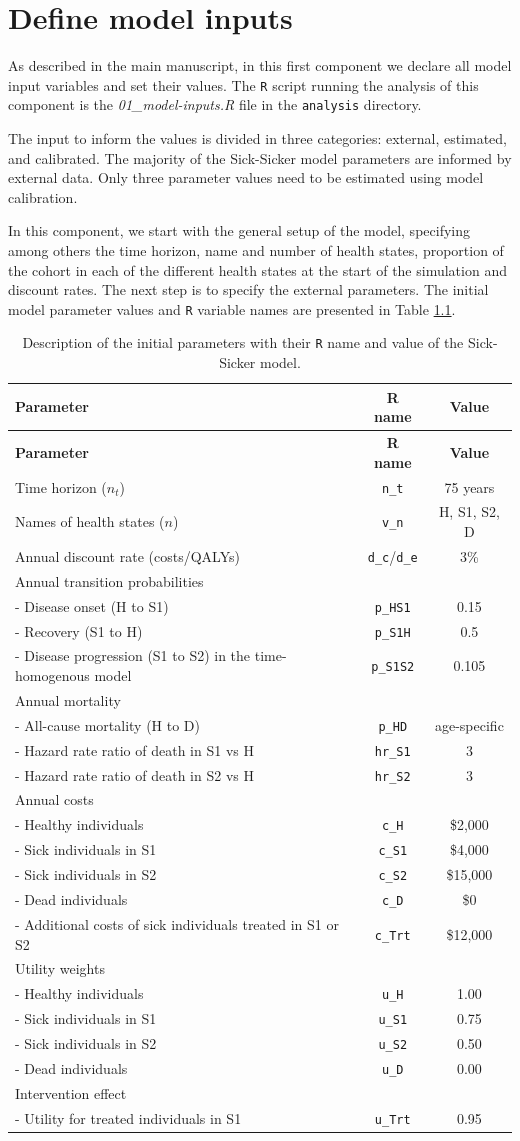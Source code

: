 \documentclass[]{book}
\begin{document}
\chapter{Define model inputs}\label{inputs}

As described in the main manuscript, in this first component we declare
all model input variables and set their values. The \texttt{R} script
running the analysis of this component is the \emph{01\_model-inputs.R}
file in the \texttt{analysis} directory.

The input to inform the values is divided in three categories: external,
estimated, and calibrated. The majority of the Sick-Sicker model
parameters are informed by external data. Only three parameter values
need to be estimated using model calibration.

In this component, we start with the general setup of the model,
specifying among others the time horizon, name and number of health
states, proportion of the cohort in each of the different health states
at the start of the simulation and discount rates. The next step is to
specify the external parameters. The initial model parameter values and
\texttt{R} variable names are presented in Table \ref{tab:parameters}.

\begin{longtable}[]{@{}lcc@{}}
\caption{\label{tab:parameters} Description of the initial parameters with
their \texttt{R} name and value of the Sick-Sicker
model.}\tabularnewline
\toprule
\textbf{Parameter} & \textbf{R name} & \textbf{Value}\tabularnewline
\midrule
\endfirsthead
\toprule
\textbf{Parameter} & \textbf{R name} & \textbf{Value}\tabularnewline
\midrule
\endhead
Time horizon (\(n_t\)) & \texttt{n\_t} & 75 years\tabularnewline
Names of health states (\(n\)) & \texttt{v\_n} & H, S1, S2,
D\tabularnewline
Annual discount rate (costs/QALYs) & \texttt{d\_c}/\texttt{d\_e} &
3\%\tabularnewline
Annual transition probabilities & &\tabularnewline
- Disease onset (H to S1) & \texttt{p\_HS1} & 0.15\tabularnewline
- Recovery (S1 to H) & \texttt{p\_S1H} & 0.5\tabularnewline
- Disease progression (S1 to S2) in the time-homogenous model &
\texttt{p\_S1S2} & 0.105\tabularnewline
Annual mortality & &\tabularnewline
- All-cause mortality (H to D) & \texttt{p\_HD} &
age-specific\tabularnewline
- Hazard rate ratio of death in S1 vs H & \texttt{hr\_S1} &
3\tabularnewline
- Hazard rate ratio of death in S2 vs H & \texttt{hr\_S2} &
3\tabularnewline
Annual costs & &\tabularnewline
- Healthy individuals & \texttt{c\_H} & \$2,000\tabularnewline
- Sick individuals in S1 & \texttt{c\_S1} & \$4,000\tabularnewline
- Sick individuals in S2 & \texttt{c\_S2} & \$15,000\tabularnewline
- Dead individuals & \texttt{c\_D} & \$0\tabularnewline
- Additional costs of sick individuals treated in S1 or S2 &
\texttt{c\_Trt} & \$12,000\tabularnewline
Utility weights & &\tabularnewline
- Healthy individuals & \texttt{u\_H} & 1.00\tabularnewline
- Sick individuals in S1 & \texttt{u\_S1} & 0.75\tabularnewline
- Sick individuals in S2 & \texttt{u\_S2} & 0.50\tabularnewline
- Dead individuals & \texttt{u\_D} & 0.00\tabularnewline
Intervention effect & &\tabularnewline
- Utility for treated individuals in S1 & \texttt{u\_Trt} &
0.95\tabularnewline
\bottomrule
\end{longtable}
\end{document}
